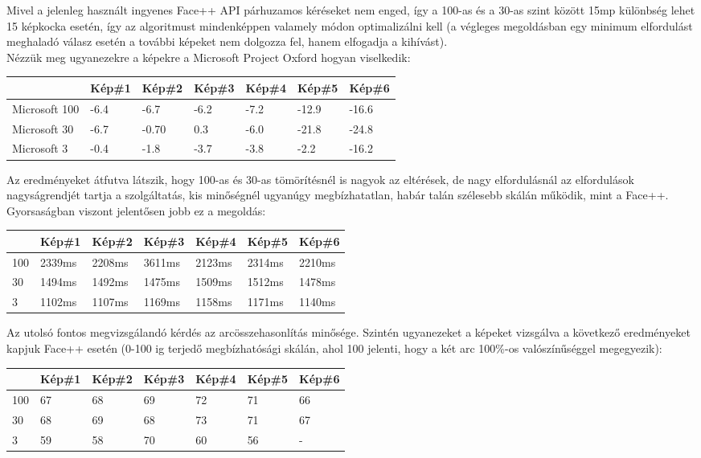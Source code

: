 Mivel a jelenleg használt ingyenes Face++ API párhuzamos kéréseket nem enged, így a 100-as és a 30-as szint között 15mp különbség lehet 15 képkocka esetén, így az algoritmust mindenképpen valamely módon optimalizálni kell (a végleges megoldásban egy minimum elfordulást meghaladó válasz esetén a további képeket nem dolgozza fel, hanem elfogadja a kihívást).
\\Nézzük meg ugyanezekre a képekre a Microsoft Project Oxford hogyan viselkedik:
\begin{center}
	\begin{tabular}{|p{2cm}|p{} |p{} | p{}|p{}|p{}|p{}|}
   	\hline
	 & Kép\#1 & Kép\#2& Kép\#3&Kép\#4 &Kép\#5 &Kép\#6\\ \hline
	Microsoft 100 & -6.4 & -6.7 & -6.2 & -7.2 & -12.9 & -16.6 \\ \hline
	Microsoft 30 & -6.7 & -0.70 & 0.3 & -6.0 & -21.8 & -24.8 \\ \hline
	Microsoft 3 & -0.4 & -1.8 & -3.7 & -3.8 & -2.2 & -16.2\\ \hline
	\end{tabular}
\end{center}

Az eredményeket átfutva látszik, hogy 100-as és 30-as tömörítésnél is nagyok az eltérések, de nagy elfordulásnál az elfordulások nagyságrendjét tartja a szolgáltatás, kis minőségnél ugyanúgy megbízhatatlan, habár talán szélesebb skálán működik, mint a Face++. Gyorsaságban viszont jelentősen jobb ez a megoldás: 
\begin{center}
	\begin{tabular}{|p{1cm}|p{} |p{} | p{}|p{}|p{}|p{}|}
   	\hline
	 & Kép\#1 & Kép\#2& Kép\#3&Kép\#4 &Kép\#5 &Kép\#6\\ \hline
	100 & 2339ms & 2208ms & 3611ms & 2123ms &2314ms & 2210ms \\ \hline
	30 & 1494ms & 1492ms & 1475ms & 1509ms & 1512ms & 1478ms \\ \hline
	3 & 1102ms & 1107ms & 1169ms & 1158ms & 1171ms & 1140ms\\ \hline
	\end{tabular}
\end{center}

Az utolsó fontos megvizsgálandó kérdés az arcösszehasonlítás minősége. Szintén ugyanezeket a képeket vizsgálva a következő eredményeket kapjuk Face++ esetén (0-100 ig terjedő megbízhatósági skálán, ahol 100 jelenti, hogy a két arc 100\%-os valószínűséggel megegyezik):
\begin{center}
	\begin{tabular}{|p{2cm}|p{} |p{} | p{}|p{}|p{}|p{}|}
   	\hline
	 & Kép\#1 & Kép\#2& Kép\#3&Kép\#4 &Kép\#5 &Kép\#6\\ \hline
	100 & 67 & 68 & 69 & 72 & 71 & 66 \\ \hline
	30 & 68 & 69 & 68 &73 & 71 & 67 \\ \hline
	3 & 59 & 58 & 70 & 60 & 56 & -\\ \hline
	\end{tabular}
\end{center}

